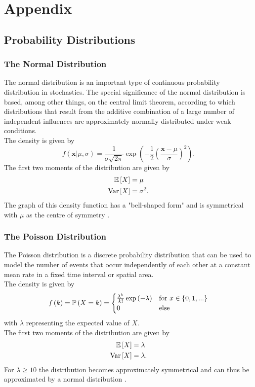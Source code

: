 %
\chapter{Appendix}
\label{sec:appendix}
\section{Probability Distributions}
\subsection{The Normal Distribution}
The normal distribution is an important type of continuous probability distribution in stochastics. The special significance of the normal distribution is based, among other things, on the central limit theorem, according to which distributions that result from the additive combination of a large number of independent influences are approximately normally distributed under weak conditions. \\
The density is given by
\begin{equation}
    f\left(\pmb{x}|\mu,\sigma\right)=\frac{1}{\sigma\sqrt{2\pi}}\exp\left(-\frac{1}{2}\left(\frac{\pmb{x}-\mu}{\sigma}\right)^2\right).
\end{equation}
The first two moments of the distribution are given by
\begin{align}
    \mathbb{E}\left[X\right] &= \mu \\
    \hbox{Var}\left[X\right] &= \sigma^2.
\end{align}
The graph of this density function has a "bell-shaped form" and is symmetrical with $\mu$ as the centre of symmetry \autocite[][83-85]{fahrmeir2016statistik}.
\subsection{The Poisson Distribution}
The Poisson distribution is a discrete probability distribution that can be used to model the number of events that occur independently of each other at a constant mean rate in a fixed time interval or spatial area. \\
The density is given by
\begin{equation}
    f\left(k\right)=\mathbb{P}\left(X=k\right)=\begin{cases}
    \frac{\lambda^k}{k!}\exp\left(-\lambda\right) & \hbox{for }x\in\left\lbrace0,1,...\right\rbrace \\
    0 & \hbox{else}
    \end{cases}
\end{equation}
with $\lambda$ representing the expected value of $X$.  \\
The first two moments of the distribution are given by
\begin{align}
    \mathbb{E}\left[X\right] &= \lambda \\
    \hbox{Var}\left[X\right] &= \lambda.
\end{align}
For $\lambda\geq10$ the distribution becomes approximately symmetrical and can thus be approximated by a normal distribution \autocite[][243]{fahrmeir2016statistik}.
